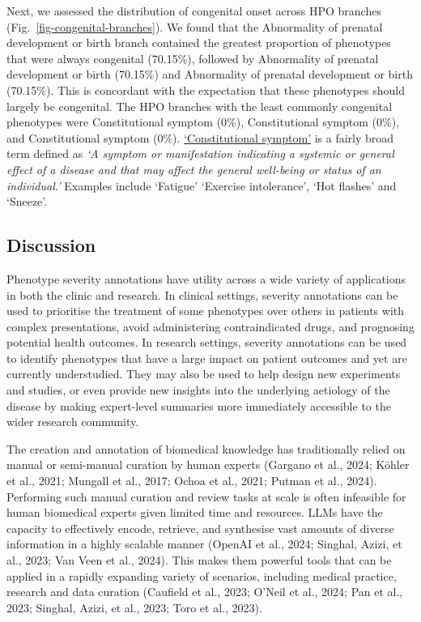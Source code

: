 \documentclass[
]{agujournal2019}
\begin{document}
Next, we assessed the distribution of congenital onset across HPO
branches (Fig.~\ref{fig-congenital-branches}). We found that the
Abnormality of prenatal development or birth branch contained the
greatest proportion of phenotypes that were always congenital (70.15\%),
followed by Abnormality of prenatal development or birth (70.15\%) and
Abnormality of prenatal development or birth (70.15\%). This is
concordant with the expectation that these phenotypes should largely be
congenital. The HPO branches with the least commonly congenital
phenotypes were Constitutional symptom (0\%), Constitutional symptom
(0\%), and Constitutional symptom (0\%).
\href{https://hpo.jax.org/app/browse/term/HP:0025142}{`Constitutional
symptom'} is a fairly broad term defined as \emph{`A symptom or
manifestation indicating a systemic or general effect of a disease and
that may affect the general well-being or status of an individual.'}
Examples include `Fatigue' `Exercise intolerance', `Hot flashes' and
`Sneeze'.

\subsection{Discussion}\label{discussion}

Phenotype severity annotations have utility across a wide variety of
applications in both the clinic and research. In clinical settings,
severity annotations can be used to prioritise the treatment of some
phenotypes over others in patients with complex presentations, avoid
administering contraindicated drugs, and prognosing potential health
outcomes. In research settings, severity annotations can be used to
identify phenotypes that have a large impact on patient outcomes and yet
are currently understudied. They may also be used to help design new
experiments and studies, or even provide new insights into the
underlying aetiology of the disease by making expert-level summaries
more immediately accessible to the wider research community.

The creation and annotation of biomedical knowledge has traditionally
relied on manual or semi-manual curation by human experts (Gargano et
al., 2024; Köhler et al., 2021; Mungall et al., 2017; Ochoa et al.,
2021; Putman et al., 2024). Performing such manual curation and review
tasks at scale is often infeasible for human biomedical experts given
limited time and resources. LLMs have the capacity to effectively
encode, retrieve, and synthesise vast amounts of diverse information in
a highly scalable manner (OpenAI et al., 2024; Singhal, Azizi, et al.,
2023; Van Veen et al., 2024). This makes them powerful tools that can be
applied in a rapidly expanding variety of scenarios, including medical
practice, research and data curation (Caufield et al., 2023; O'Neil et
al., 2024; Pan et al., 2023; Singhal, Azizi, et al., 2023; Toro et al.,
2023).
\end{document}
